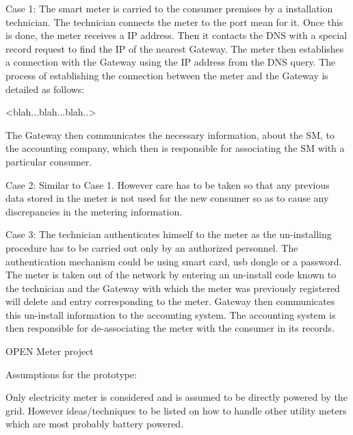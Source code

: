 Case 1: The smart meter is carried to the consumer premises by a installation technician. The technician connects the meter to the port mean for it. Once this is done, the meter receives a IP  address. Then it contacts the DNS with a special record request to find the IP of the nearest Gateway. The meter then establishes a connection with the Gateway using the IP address from the DNS query. The process of establishing the connection between the meter and the Gateway is detailed as follows:

<blah...blah...blah..>

The Gateway then communicates the necessary information, about the SM, to the accounting company, which then is responsible for associating the SM with a particular consumer.

Case 2: Similar to Case 1. However care has to be taken so that any previous data stored in the meter is not used for the new consumer so as to cause any discrepancies in the metering information.

Case 3: The technician authenticates himself to the meter as the un-installing procedure has to be carried out only by an authorized personnel. The authentication mechanism could be using  smart card, usb dongle or a password. The meter is taken out of the network by entering an un-install code known to the technician and the Gateway with which the meter was previously registered will delete and entry corresponding to the meter. Gateway then communicates this un-install information to the accounting system. The accounting system is then responsible for de-associating the meter with the consumer in its records. 

OPEN Meter project

Assumptions for the prototype:

Only electricity meter is considered and is assumed to be directly powered by the grid. However ideas/techniques to be listed on how to handle other utility meters which are most probably battery powered.